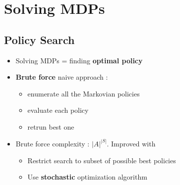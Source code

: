 \documentclass[12pt]{article} %
\begin{document}
\section{Solving MDPs}

\subsection{Policy Search}
\begin{itemize}
\item Solving MDPs = finding \textbf{optimal policy}
\item \textbf{Brute force} naive approach :
\begin{itemize}
\item enumerate all the Markovian policies
\item evaluate each policy
\item retrun best one
\end{itemize}

\item Brute force complexity : $|A|^{|S|}$. Improved with
\begin{itemize}
\item Restrict search to subset of possible best policies
\item Use \textbf{stochastic} optimization algorithm
\end{itemize}
\end{itemize}
\end{document}
